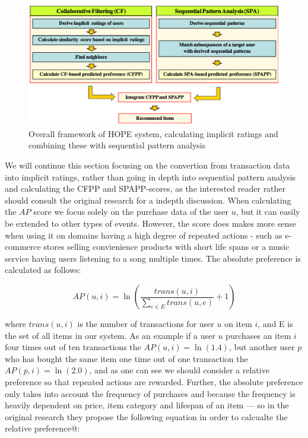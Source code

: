 \begin{figure}[H]
  \centering
  \includegraphics[scale=0.3]{image/hope-system}
  \caption{Overall framework of HOPE system, calculating implicit ratings and
  combining these with sequential pattern analysis}
  \label{hope-system}
\end{figure}

We will continue this section focusing on the convertion from transaction data
into implicit ratings, rather than going in depth into sequential pattern
analysis and calculating the CFPP and SPAPP-scores, as the interested reader
rather should consult the original research for a indepth discussion. When
calculating the $AP$ score we focus solely on the purchase data of the user
$u$, but it can easily be extended to other types of events. However, the score
does makes more sense when using it on domains having a high degree of repeated
actions - such as e-commerce stores selling convienience products with short
life spans or a music service having users listening to a song multiple times.
The absolute preference is calculated as follows:

\begin{equation}
  AP(u,i) = \ln(\frac{trans(u,i)}{\sum_{e \in E}{trans(u, e)}} + 1)
\end{equation}

where $trans(u,i)$ is the number of transactions for user $u$ on item $i$, and
E is the set of all items in our system. As an example if a user $u$ purchases an
item $i$ four times out of ten transactions the $AP(u,i) = \ln(1.4)$, but another
user $p$ who has bought the same item one time out of one transaction the
$AP(p,i) = \ln(2.0)$, and as one can see we should consider a relative preference so
that repeated actions are rewarded. Further, the absolute preference only takes
into account the frequency of purchases and because the frequency is heavily
dependent on price, item category and lifespan of an item — so in the original
research they propose the following equation in order to calcualte the relative
preference@:

